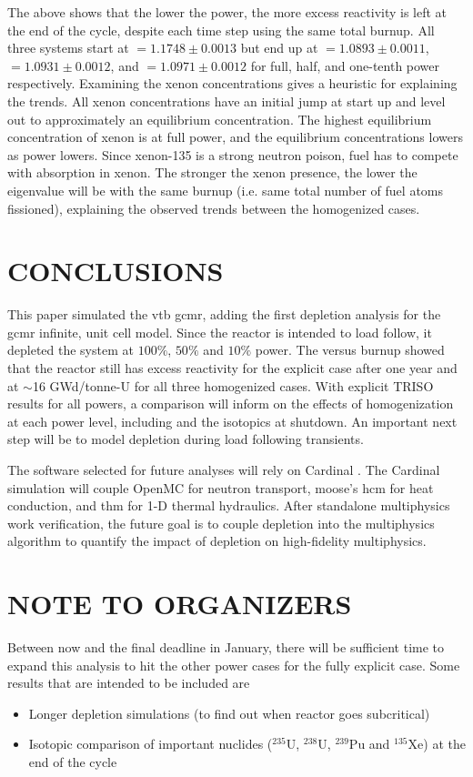 \documentclass[letterpaper]{physor2024}
\begin{document}
The above shows that the lower the power, the more excess reactivity is left at the end of the cycle, despite each time step using the same total burnup. All three systems start at \kinf$=1.1748 \pm 0.0013 $ but end up at \kinf$=1.0893 \pm 0.0011 $, \kinf$=1.0931 \pm 0.0012$, and \kinf$=1.0971 \pm 0.0012$ for full, half, and one-tenth power respectively. Examining the xenon concentrations gives a heuristic for explaining the trends. All xenon concentrations have an initial jump at start up and level out to approximately an equilibrium concentration. The highest equilibrium concentration of xenon is at full power, and the equilibrium concentrations lowers as power lowers. Since xenon-135 is a strong neutron poison, fuel has to compete with absorption in xenon. The stronger the xenon presence, the lower the eigenvalue will be with the same burnup (i.e. same total number of fuel atoms fissioned), explaining the observed trends between the homogenized cases.

\section{CONCLUSIONS}\label{sec:conclusions}
This paper simulated the \gls{vtb} \gls{gcmr}, adding the first depletion analysis for the \gls{gcmr} infinite, unit cell model. Since the reactor is intended to load follow, it depleted the system at $100\%$, $50\%$ and $10\%$ power. The \kinf versus burnup showed that the reactor still has excess reactivity for the explicit case after one year and at $\sim$16 GWd/tonne-U for all three homogenized cases. With explicit TRISO results for all powers, a comparison will inform on the effects of homogenization at each power level, including \kinf and the isotopics at shutdown. An important next step will be to model depletion during load following transients.

The software selected for future analyses will rely on Cardinal \cite{novak2022-cardinal}. The Cardinal simulation will couple OpenMC for neutron transport, \gls{moose}'s \gls{hcm} for heat conduction, and \gls{thm} for 1-D thermal hydraulics. After standalone multiphysics work verification, the future goal is to couple depletion into the multiphysics algorithm to quantify the impact of depletion on high-fidelity multiphysics.

\section*{NOTE TO ORGANIZERS}
Between now and the final deadline in January, there will be sufficient time to expand this analysis to hit the other power cases for the fully explicit case. Some results that are intended to be included are
\begin{itemize}
    \item Longer depletion simulations (to find out when reactor goes subcritical)
    \item Isotopic comparison of important nuclides ($^{235}$U, $^{238}$U, $^{239}$Pu and $^{135}$Xe) at the end of the cycle
\end{itemize}
\end{document}
